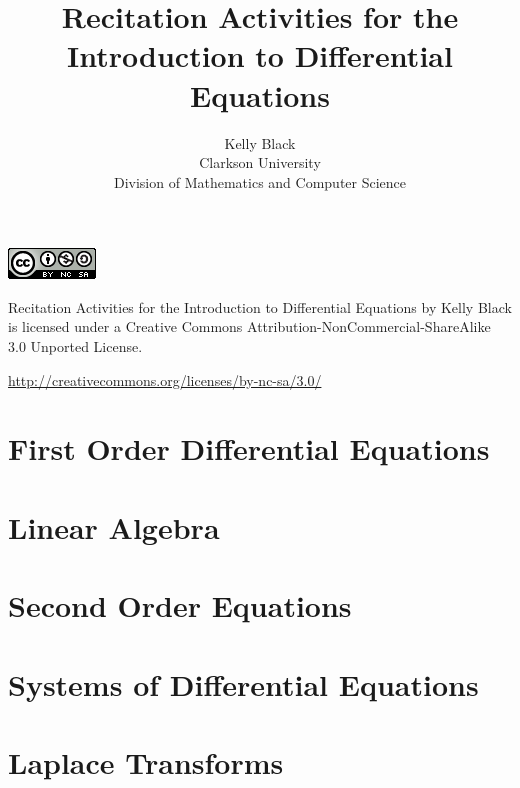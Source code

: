 \documentclass[12pt,twoside]{book}
\begin{document}
\title{Recitation Activities for the Introduction to Differential
  Equations}
\author{Kelly Black\\Clarkson University\\Division of Mathematics and
  Computer Science}

\maketitle



\begin{center}
  
  \includegraphics{ccV3}

  Recitation Activities for the Introduction to Differential Equations
  by Kelly Black is licensed under a Creative Commons
  Attribution-NonCommercial-ShareAlike 3.0 Unported License.

  \url{http://creativecommons.org/licenses/by-nc-sa/3.0/ }

\end{center}

\tableofcontents


\chapter{First Order Differential Equations}


\chapter{Linear Algebra}



\chapter{Second Order Equations}

\chapter{Systems of Differential Equations}

\chapter{Laplace Transforms}
\end{document}
